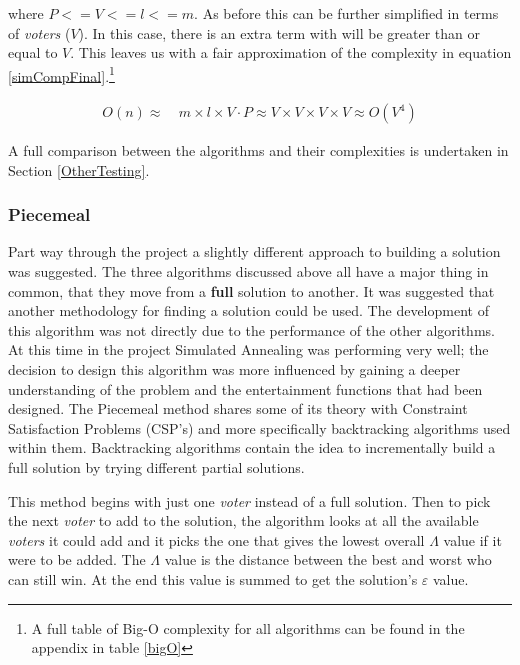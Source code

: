 \documentclass[12pt]{report}
\begin{document}
where $P <= V <= l <= m$. As before this can be further simplified in terms of \textit{voters} ($V$). In this case, there is an extra term with will be greater than or equal to $V$. This leaves us with a fair approximation of the complexity in equation \ref{simCompFinal}.\footnote{A full table of Big-O complexity for all algorithms can be found in the appendix in table \ref{bigO}}

\begin{equation}\label{simCompFinal}
\begin{aligned}
	O(n) \approx{} & \ m \times l \times V \cdot P \approx V \times V \times V \times V \approx O(V^4)
\end{aligned}
\end{equation}

A full comparison between the algorithms and their complexities is undertaken in Section \ref{OtherTesting}.


\subsubsection{Piecemeal}
Part way through the project a slightly different approach to building a solution was suggested. The three algorithms discussed above all have a major thing in common, that they move from a \textbf{full} solution to another. It was suggested that another methodology for finding a solution could be used. The development of this algorithm was not directly due to the performance of the other algorithms. At this time in the project Simulated Annealing was performing very well; the decision to design this algorithm was more influenced by gaining a deeper understanding of the problem and the entertainment functions that had been designed. The Piecemeal method shares some of its theory with Constraint Satisfaction Problems (CSP's)\cite{CSP} and more specifically backtracking algorithms used within them\cite{backtracking}. Backtracking algorithms contain the idea to incrementally build a full solution by trying different partial solutions.

This method begins with just one \textit{voter} instead of a full solution. Then to pick the next \textit{voter} to add to the solution, the algorithm looks at all the available \textit{voters} it could add and it picks the one that gives the lowest overall $\Lambda$ value if it were to be added. The $\Lambda$ value is the distance between the best and worst who can still win. At the end this value is summed to get the solution's $\varepsilon$ value.
\end{document}

